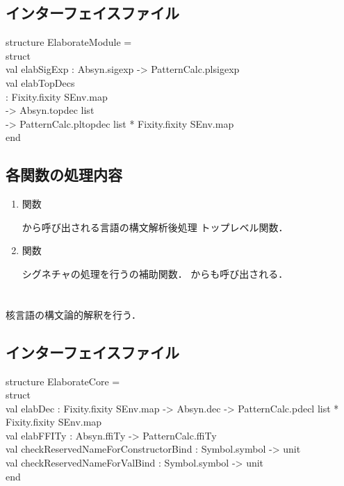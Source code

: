 \subsection{インターフェイスファイル}
\begin{program}
structure ElaborateModule =\\
\myem  struct\\
\myem\myem    val elabSigExp : Absyn.sigexp -> PatternCalc.plsigexp\\
\myem\myem    val elabTopDecs\\
\myem\myem\myem        : Fixity.fixity SEnv.map\\
\myem\myem\myem\myem          -> Absyn.topdec list\\
\myem\myem\myem\myem          -> PatternCalc.pltopdec list * Fixity.fixity SEnv.map\\
\myem  end
\end{program}
\subsection{各関数の処理内容}
\begin{enumerate}
\item {}関数

	から呼び出される\smlsharp{}言語の構文解析後処理
トップレベル関数．

\item {}関数

	シグネチャの処理を行うの補助関数．
	からも呼び出される．

\end{enumerate}
\else%
\fi%


\section{}
\ifjp%

	核言語の構文論的解釈を行う．

\subsection{インターフェイスファイル}
\begin{program}
structure ElaborateCore =\\
struct\\
\myem  val elabDec 
\myem\myem
    : Fixity.fixity SEnv.map -> Absyn.dec -> PatternCalc.pdecl list * Fixity.fixity SEnv.map\\
\myem  val elabFFITy : Absyn.ffiTy -> PatternCalc.ffiTy\\
\myem  val checkReservedNameForConstructorBind : Symbol.symbol -> unit\\
\myem  val checkReservedNameForValBind : Symbol.symbol -> unit\\
end
\end{program}

